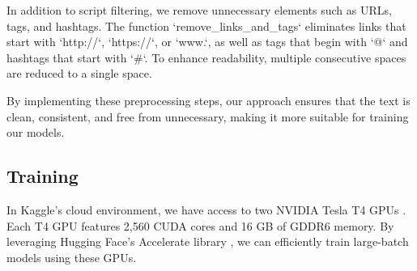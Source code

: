 \documentclass[11pt]{article}
\begin{document}
In addition to script filtering, we remove unnecessary elements such as URLs, tags, and hashtags. The function `remove\_links\_and\_tags` eliminates links that start with `http://`, `https://`, or `www.`, as well as tags that begin with `@` and hashtags that start with `\#`. To enhance readability, multiple consecutive spaces are reduced to a single space.  

By implementing these preprocessing steps, our approach ensures that the text is clean, consistent, and free from unnecessary, making it more suitable for training our models.


\subsection{Training}
In Kaggle's cloud environment, we have access to two NVIDIA Tesla T4 GPUs \citep{nvidiaT4}. Each T4 GPU features 2,560 CUDA cores and 16 GB of GDDR6 memory. By leveraging Hugging Face's Accelerate library \citep{accelerate}, we can efficiently train large-batch models using these GPUs.
\end{document}
